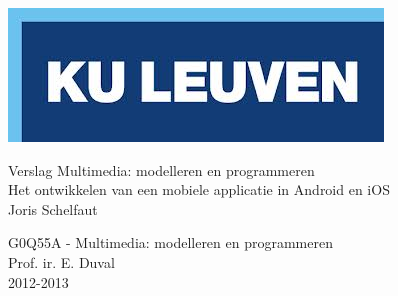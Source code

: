 \documentclass[a4paper,twoside,10pt]{report}
\begin{document}
\pagestyle{empty} %




\begin{titlepage}

\includegraphics[height=.15\textheight,width=.50\textwidth]{data/kuleuven.png}\\[3cm]

		\begin{center}
		\Huge Verslag Multimedia: modelleren en programmeren \\ [.5 cm]
		
		\LARGE Het ontwikkelen van een mobiele applicatie in Android en iOS \\ [.5 cm]
		\LARGE Joris Schelfaut	\\ [5 cm]
		\end{center}
		\large G0Q55A - Multimedia: modelleren en programmeren	\\
		\large Prof. ir. E. Duval	\\
		\large 2012-2013	\\ [1 cm]
	\vfill

\end{titlepage}


\end{document}
